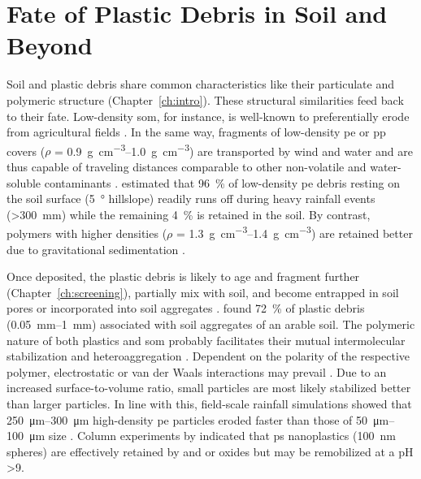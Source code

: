 \section{Fate of Plastic Debris in Soil and Beyond}
\label{sec:general-discussion:fate}

Soil and plastic debris share common characteristics like their particulate and polymeric structure (Chapter~\ref{ch:intro}). These structural similarities feed back to their fate.
Low-density \ac{som}, for instance, is well-known to preferentially erode from agricultural fields \citep{LalSoil2005,RumpelPreferential2006}. In the same way, fragments of low-density \ac{pe} or \ac{pp} covers ($\rho$ = \SIrange{0.9}{1.0}{\gram\per\cubic\centi\meter}) are transported by wind \citep{RezaeiWind2019,BullardPreferential2021} and water \citep{LaermannsTracing2021,RehmSoil2021} and are thus capable of traveling distances comparable to other non-volatile and water-soluble contaminants \citep{StubbinsPlastics2021}.  estimated that \SI{96}{\percent} of low-density \ac{pe} debris resting on the soil surface (\SI{5}{\degree} hillslope) readily runs off during heavy rainfall events (\SI{>300}{\milli\meter}) while the remaining \SI{4}{\percent} is retained in the soil. By contrast, polymers with higher densities ($\rho$ = \SIrange{1.3}{1.4}{\gram\per\cubic\centi\meter}) are retained better due to gravitational sedimentation \citep{DongTransport2021,O'ConnorMicroplastics2019}.

Once deposited, the plastic debris is likely to age and fragment further (Chapter~\ref{ch:screening}), partially mix with soil, and become entrapped in soil pores or incorporated into soil aggregates \citep{RilligMicroplastic2017}.  found \SI{72}{\percent} of plastic debris (\SIrange{0.05}{1}{\milli\meter}) associated with soil aggregates of an arable soil. The polymeric nature of both plastics and \ac{som} probably facilitates their mutual intermolecular stabilization and heteroaggregation \citep{SchaumannSoil2006,LuoDistribution2020}. Dependent on the polarity of the respective polymer, electrostatic or van der Waals interactions may prevail \citep{LuoDistribution2020}. Due to an increased surface-to-volume ratio, small particles are most likely stabilized better than larger particles. In line with this, field-scale rainfall simulations showed that \SIrange{250}{300}{\micro\meter} high-density \ac{pe} particles eroded faster than those of \SIrange{50}{100}{\micro\meter} size \citep{RehmSoil2021}. Column experiments by \citet{WuTransport2020} indicated that \ac{ps} nanoplastics (\SI{100}{\nano\meter} spheres) are effectively retained by  and  or  oxides but may be remobilized at a pH \num{>9}.


